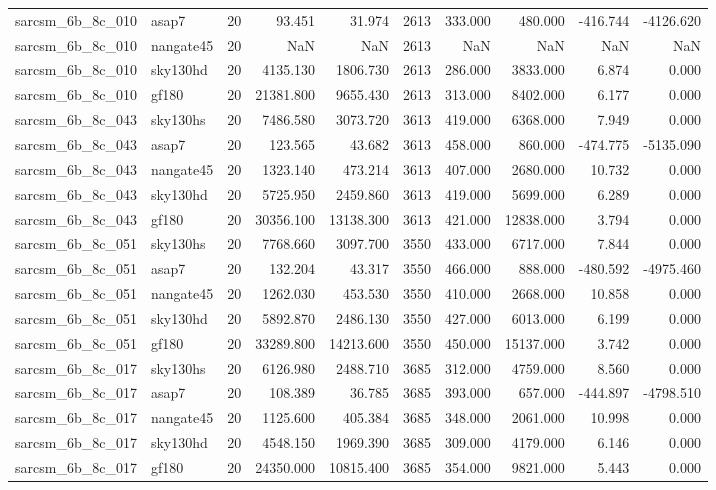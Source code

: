 \begin{tabular}{llrrrrrrrr}
sarcsm\_6b\_8c\_010 & asap7 & 20 & 93.451 & 31.974 & 2613 & 333.000 & 480.000 & -416.744 & -4126.620 \\
sarcsm\_6b\_8c\_010 & nangate45 & 20 & NaN & NaN & 2613 & NaN & NaN & NaN & NaN \\
sarcsm\_6b\_8c\_010 & sky130hd & 20 & 4135.130 & 1806.730 & 2613 & 286.000 & 3833.000 & 6.874 & 0.000 \\
sarcsm\_6b\_8c\_010 & gf180 & 20 & 21381.800 & 9655.430 & 2613 & 313.000 & 8402.000 & 6.177 & 0.000 \\
sarcsm\_6b\_8c\_043 & sky130hs & 20 & 7486.580 & 3073.720 & 3613 & 419.000 & 6368.000 & 7.949 & 0.000 \\
sarcsm\_6b\_8c\_043 & asap7 & 20 & 123.565 & 43.682 & 3613 & 458.000 & 860.000 & -474.775 & -5135.090 \\
sarcsm\_6b\_8c\_043 & nangate45 & 20 & 1323.140 & 473.214 & 3613 & 407.000 & 2680.000 & 10.732 & 0.000 \\
sarcsm\_6b\_8c\_043 & sky130hd & 20 & 5725.950 & 2459.860 & 3613 & 419.000 & 5699.000 & 6.289 & 0.000 \\
sarcsm\_6b\_8c\_043 & gf180 & 20 & 30356.100 & 13138.300 & 3613 & 421.000 & 12838.000 & 3.794 & 0.000 \\
sarcsm\_6b\_8c\_051 & sky130hs & 20 & 7768.660 & 3097.700 & 3550 & 433.000 & 6717.000 & 7.844 & 0.000 \\
sarcsm\_6b\_8c\_051 & asap7 & 20 & 132.204 & 43.317 & 3550 & 466.000 & 888.000 & -480.592 & -4975.460 \\
sarcsm\_6b\_8c\_051 & nangate45 & 20 & 1262.030 & 453.530 & 3550 & 410.000 & 2668.000 & 10.858 & 0.000 \\
sarcsm\_6b\_8c\_051 & sky130hd & 20 & 5892.870 & 2486.130 & 3550 & 427.000 & 6013.000 & 6.199 & 0.000 \\
sarcsm\_6b\_8c\_051 & gf180 & 20 & 33289.800 & 14213.600 & 3550 & 450.000 & 15137.000 & 3.742 & 0.000 \\
sarcsm\_6b\_8c\_017 & sky130hs & 20 & 6126.980 & 2488.710 & 3685 & 312.000 & 4759.000 & 8.560 & 0.000 \\
sarcsm\_6b\_8c\_017 & asap7 & 20 & 108.389 & 36.785 & 3685 & 393.000 & 657.000 & -444.897 & -4798.510 \\
sarcsm\_6b\_8c\_017 & nangate45 & 20 & 1125.600 & 405.384 & 3685 & 348.000 & 2061.000 & 10.998 & 0.000 \\
sarcsm\_6b\_8c\_017 & sky130hd & 20 & 4548.150 & 1969.390 & 3685 & 309.000 & 4179.000 & 6.146 & 0.000 \\
sarcsm\_6b\_8c\_017 & gf180 & 20 & 24350.000 & 10815.400 & 3685 & 354.000 & 9821.000 & 5.443 & 0.000 \\

\end{tabular}
